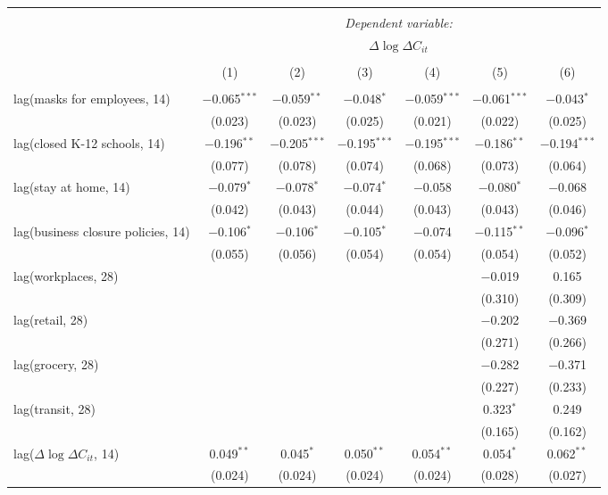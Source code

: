 \begin{tabular}{@{\extracolsep{1pt}}lcccccc} 
\\[-1.8ex]\hline 
\hline \\[-1.8ex] 
 & \multicolumn{6}{c}{\textit{Dependent variable:}} \\ 
\cline{2-7} 
 & \multicolumn{6}{c}{$\Delta \log \Delta C_{it}$} \\ 
\\[-1.8ex] & (1) & (2) & (3) & (4) & (5) & (6)\\ 
\hline \\[-1.8ex] 
 lag(masks for employees, 14) & $-$0.065$^{***}$ & $-$0.059$^{**}$ & $-$0.048$^{*}$ & $-$0.059$^{***}$ & $-$0.061$^{***}$ & $-$0.043$^{*}$ \\ 
  & (0.023) & (0.023) & (0.025) & (0.021) & (0.022) & (0.025) \\ 
  lag(closed K-12 schools, 14) & $-$0.196$^{**}$ & $-$0.205$^{***}$ & $-$0.195$^{***}$ & $-$0.195$^{***}$ & $-$0.186$^{**}$ & $-$0.194$^{***}$ \\ 
  & (0.077) & (0.078) & (0.074) & (0.068) & (0.073) & (0.064) \\ 
  lag(stay at home, 14) & $-$0.079$^{*}$ & $-$0.078$^{*}$ & $-$0.074$^{*}$ & $-$0.058 & $-$0.080$^{*}$ & $-$0.068 \\ 
  & (0.042) & (0.043) & (0.044) & (0.043) & (0.043) & (0.046) \\ 
  lag(business closure policies, 14) & $-$0.106$^{*}$ & $-$0.106$^{*}$ & $-$0.105$^{*}$ & $-$0.074 & $-$0.115$^{**}$ & $-$0.096$^{*}$ \\ 
  & (0.055) & (0.056) & (0.054) & (0.054) & (0.054) & (0.052) \\ 
  lag(workplaces, 28) &  &  &  &  & $-$0.019 & 0.165 \\ 
  &  &  &  &  & (0.310) & (0.309) \\ 
  lag(retail, 28) &  &  &  &  & $-$0.202 & $-$0.369 \\ 
  &  &  &  &  & (0.271) & (0.266) \\ 
  lag(grocery, 28) &  &  &  &  & $-$0.282 & $-$0.371 \\ 
  &  &  &  &  & (0.227) & (0.233) \\ 
  lag(transit, 28) &  &  &  &  & 0.323$^{*}$ & 0.249 \\ 
  &  &  &  &  & (0.165) & (0.162) \\ 
  lag($\Delta \log \Delta C_{it}$, 14) & 0.049$^{**}$ & 0.045$^{*}$ & 0.050$^{**}$ & 0.054$^{**}$ & 0.054$^{*}$ & 0.062$^{**}$ \\ 
  & (0.024) & (0.024) & (0.024) & (0.024) & (0.028) & (0.027) \\ 

\end{tabular}
